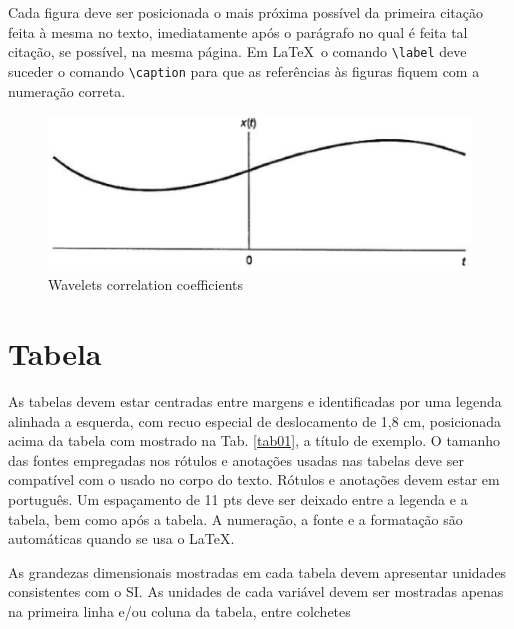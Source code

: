 Cada figura deve ser posicionada o mais próxima possível da primeira citação 
feita à mesma no texto, imediatamente após o parágrafo no qual é feita tal 
citação, se possível, na mesma página. Em \LaTeX\, o comando \texttt{\textbackslash label} deve suceder o comando \texttt{\textbackslash caption} para que as referências às figuras fiquem com a numeração correta.
\begin{figure}[h]
	\centering
	\includegraphics[keepaspectratio=true,scale=0.3]{figuras/fig01.eps}
	\caption{Wavelets correlation coefficients}
	\label{fig01}
\end{figure}

\section{Tabela}

As tabelas devem estar centradas entre margens e identificadas por uma legenda 
alinhada a esquerda, com recuo especial de deslocamento de 1,8 cm, posicionada 
acima da tabela com mostrado na Tab. \ref{tab01}, a título de 
exemplo. O tamanho das fontes empregadas nos rótulos e anotações usadas nas 
tabelas deve ser compatível com o usado no corpo do texto. Rótulos e anotações 
devem estar em português. Um espaçamento de 11 pts deve ser deixado entre a 
legenda e a tabela, bem como após a tabela. A numeração, a fonte e a formatação
são automáticas quando se usa o \LaTeX.

As grandezas dimensionais mostradas em cada tabela devem apresentar unidades 
consistentes com o SI. As unidades de cada variável devem ser mostradas apenas 
na primeira linha e/ou coluna da tabela, entre colchetes 

